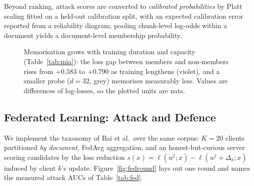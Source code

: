 \documentclass[11pt,a4paper]{article}
\theoremstyle{plain}
\theoremstyle{definition}
\begin{document}
Beyond ranking, attack scores are converted to \emph{calibrated
probabilities} by Platt scaling fitted on a held-out calibration split, with
an expected calibration error reported from a reliability diagram; pooling
chunk-level log-odds within a document yields a document-level membership
probability.

\begin{figure}[h]
\centering
{}
\caption{Memorisation grows with training duration and capacity
(Table~\protect\ref{tab:mia}): the loss gap between members and non-members rises
from $+0.583$ to $+0.790$ as training lengthens (violet), and a smaller
probe ($d=32$, grey) memorises measurably less. Values are differences of
log-losses, so the plotted units are nats.}
\label{fig:miagap}
\end{figure}

\subsection{Federated Learning: Attack and Defence}

We implement the taxonomy of Bai et al.\ over the same corpus: $K=20$ clients
partitioned \emph{by document}, FedAvg aggregation, and an honest-but-curious
server scoring candidates by the loss reduction
$s(x)=\ell(w^{t};x)-\ell(w^{t}+\Delta_k;x)$ induced by client $k$'s update.
Figure~\ref{fig:fedround} lays out one round and names the measured attack
AUCs of Table~\ref{tab:fed}.
\end{document}

